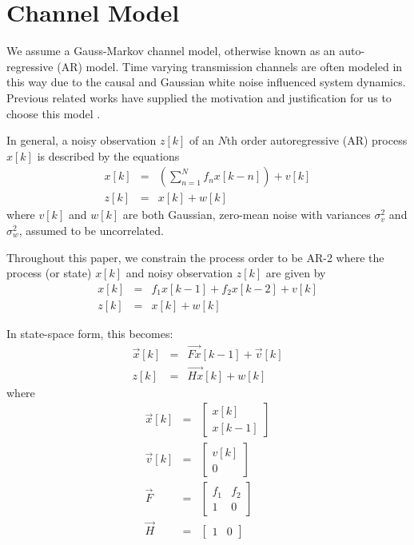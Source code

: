 \documentclass[twocolumn,letterpaper]{IEEEAerospaceCLS}  %
\begin{document}
\section{Channel Model}
\label{sec:channelmodel}

We assume a Gauss-Markov channel model, otherwise known as 
an %
auto-regressive (AR) model. Time varying transmission channels are often modeled in this way due to the causal and Gaussian white noise influenced system dynamics. Previous related works have supplied the motivation and justification for us to choose this model \cite{181202986} \cite{baddour2001autoregressive} \cite{wen2008autoregressive}.

In general, a noisy observation $z[k]$ of an $N$th order autoregressive (AR) process $x[k]$ is described by the equations
\begin{eqnarray*}
x[k]&=&\left(\sum_{n=1}^N f_{n}x[k-n]\right) + v[k]\\
z[k]&=&x[k] + w[k]
\end{eqnarray*}
where $v[k]$ and $w[k]$ are both Gaussian, zero-mean noise with variances $\sigma_v^2$ and $\sigma_w^2$, assumed to be uncorrelated.

Throughout this paper, we constrain the process order to be AR-2 where the process (or state) $x[k]$ and noisy observation $z[k]$ are given by
\begin{eqnarray*}
x[k]&=&f_1x[k-1]+ f_2x[k-2] + v[k]\\
z[k]&=&x[k] + w[k]
\end{eqnarray*}

In state-space form, this becomes:
\begin{eqnarray*}
\vec{x}[k]&=&\vec{Fx}[k-1]+\vec{v}[k]\\
z[k]&=&\vec{Hx}[k]+w[k]
\end{eqnarray*}
where
\begin{eqnarray*}
\vec{x}[k]&=&\begin{bmatrix}
    x[k]\\ x[k-1]
\end{bmatrix}\\
\vec{v}[k]&=&\begin{bmatrix}
    v[k]\\ 0
\end{bmatrix}\\
\vec{F}&=&\begin{bmatrix}
    f_1       & f_2 \\
    1       & 0 
\end{bmatrix}\\
\vec{H}&=&\begin{bmatrix}
    1       & 0 
\end{bmatrix}
\end{eqnarray*}
\end{document}
